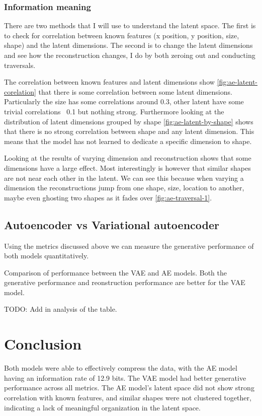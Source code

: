 \documentclass[conference,a4paper]{IEEEtran}
\newcommand{\centertable}[2]{
    \begin{table}[htbp]
        \centering
        \caption{#2}
        
        \label{tab:#1}
    \end{table}
}
\begin{document}
\subsubsection{Information meaning}

There are two methods that I will use to understand the latent space. The first is to check for correlation between known features (x position, y position, size, shape) and the latent dimensions. The second is to change the latent dimensions and see how the reconstruction changes, I do by both zeroing out and conducting traversals.

The correlation between known features and latent dimensions show \ref{fig:ae-latent-corelation} that there is some correlation between some latent dimensions. Particularly the size has some correlations around 0.3, other latent have some trivial correlations ~0.1 but nothing strong. Furthermore looking at the distribution of latent dimensions grouped by shape \ref{fig:ae-latent-by-shape} shows that there is no strong correlation between shape and any latent dimension. This means that the model has not learned to dedicate a specific dimension to shape. 

Looking at the results of varying dimension and reconstruction shows that some dimensions have a large effect. Most interestingly is however that similar shapes are not near each other in the latent. We can see this because when varying a dimension the reconstructions jump from one shape, size, location to another, maybe even ghosting two shapes as it fades over \ref{fig:ae-traversal-1}.

\subsection{Autoencoder vs Variational autoencoder}

Using the metrics discussed above we can measure the generative performance of both models quantitatively.

\centertable{ae-vs-vae}{Comparison of performance between the VAE and AE models. Both the generative performance and reonstruction performance are better for the VAE model.}

TODO: Add in analysis of the table.

\section{Conclusion}

Both models were able to effectively compress the data, with the AE model having an information rate of 12.9 bits. The VAE model had better generative performance across all metrics. The AE model's latent space did not show strong correlation with known features, and similar shapes were not clustered together, indicating a lack of meaningful organization in the latent space.
\end{document}
